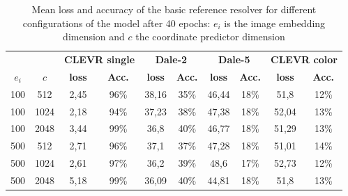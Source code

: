 \begin{table}[ht]
    \centering
    \begin{tabular}{cc|cc|cc|cc|cc}
        \toprule
              &        & \multicolumn{2}{c}{\textbf{CLEVR single}} & \multicolumn{2}{c}{\textbf{Dale-2}} & \multicolumn{2}{c}{\textbf{Dale-5}} & \multicolumn{2}{c}{\textbf{CLEVR color}}                                                                 \\  \cmidrule(lr){3-4}\cmidrule(lr){5-6}\cmidrule(lr){7-8}\cmidrule(lr){9-10}
        $e_i$ & $c$    & \textbf{loss}                             & \textbf{Acc.}                       & \textbf{loss}                       & \textbf{Acc.}                            & \textbf{loss} & \textbf{Acc.} & \textbf{loss} & \textbf{Acc.} \\\midrule
        {100} & {512}  & {2,45}                                    & {96\%}                              & {38,16}                             & {35\%}                                   & {46,44}       & {18\%}        & {51,8}        & {12\%}        \\
        {100} & {1024} & {2,18}                                    & {94\%}                              & {37,23}                             & {38\%}                                   & {47,38}       & {18\%}        & {52,04}       & {13\%}        \\
        {100} & {2048} & {3,44}                                    & {99\%}                              & {36,8}                              & {40\%}                                   & {46,77}       & {18\%}        & {51,29}       & {13\%}        \\
        {500} & {512}  & {2,71}                                    & {96\%}                              & {37,1}                              & {37\%}                                   & {47,28}       & {18\%}        & {51,01}       & {14\%}        \\
        {500} & {1024} & {2,61}                                    & {97\%}                              & {36,2}                              & {39\%}                                   & {48,6}        & {17\%}        & {52,73}       & {12\%}        \\
        {500} & {2048} & {5,18}                                    & {99\%}                              & {36,09}                             & {40\%}                                   & {44,81}       & {18\%}        & {51,8}        & {13\%}        \\
        \bottomrule
    \end{tabular}
    \caption{Mean loss and accuracy of the basic reference resolver for different configurations of the model after 40 epochs: $e_i$ is the image embedding dimension and $c$ the coordinate predictor dimension}
    \label{tab:results:reference-resolver}
\end{table}

